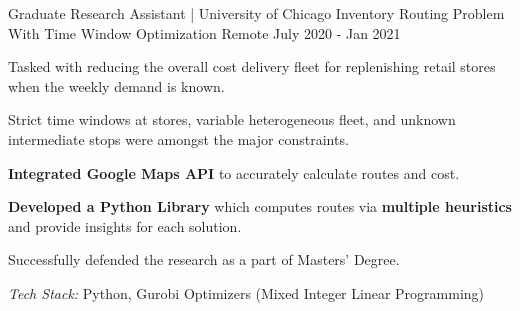 \documentclass[11pt, a4paper]{awesome-cv} %
\begin{document}









\begin{cventries}

  \cventry
    {Graduate Research Assistant | University of Chicago} %
    {Inventory Routing Problem With Time Window Optimization} %
    {Remote} %
    {July 2020 - Jan 2021} %
    {
      \begin{cvitems} %
        \item {Tasked with reducing the overall cost delivery fleet for replenishing retail stores when the weekly demand is known.}
        \item {Strict time windows at stores, variable heterogeneous fleet, and unknown intermediate stops were amongst the major constraints.}
        \item {\textbf{ Integrated Google Maps API}} to accurately calculate routes and cost.
        \item {\textbf{Developed a Python Library} which computes routes via \textbf{multiple heuristics} and provide insights for each solution.}
        \item Successfully defended the research as a part of Masters' Degree.
        \item {\textit{{\color{awesome-red} Tech Stack:}} Python, Gurobi Optimizers (Mixed Integer Linear Programming)}
        \end{cvitems}
    }


\end{cventries}
\end{document}
